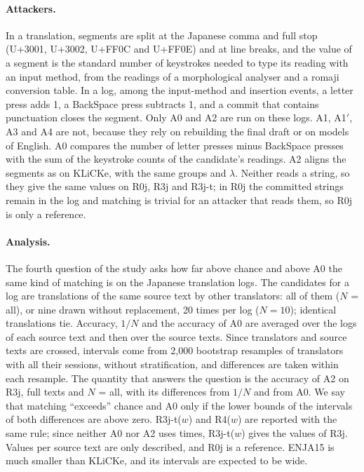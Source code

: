 \paragraph{Attackers.}
In a translation, segments are split at the Japanese comma and full stop (U+3001, U+3002, U+FF0C and U+FF0E) and at
line breaks, and the value of a segment
is the standard number of keystrokes needed to type its reading with an input method, from the readings of a
morphological analyser and a romaji conversion table. In a log, among the input-method and insertion events, a letter
press adds 1, a BackSpace press subtracts 1, and a commit that contains punctuation closes the segment. Only A0 and A2
are run on these logs. A1, A1$'$, A3 and A4 are not, because they rely on rebuilding the final draft or on models of
English. A0 compares the number of letter presses minus BackSpace presses with the sum of the keystroke counts of the
candidate's readings. A2 aligns the segments as on KLiCKe, with the same groups and $\lambda$. Neither reads a string,
so they give the same values on R0j, R3j and R3j-t; in R0j the committed strings remain in the log and matching is
trivial for an attacker that reads them, so R0j is only a reference.

\paragraph{Analysis.}
The fourth question of the study asks how far above chance and above A0 the same kind of matching is on the Japanese
translation logs. The candidates for a log are translations of the same source text by other translators: all of them
($N$ = all), or nine drawn without replacement, 20 times per log ($N = 10$); identical translations tie. Accuracy, $1/N$
and the accuracy of A0 are averaged over the logs of each source text and then over the source texts. Since
translators and source texts are crossed, intervals come from 2,000 bootstrap resamples of translators with all their
sessions, without stratification, and differences are taken within each resample. The quantity that answers the
question is the accuracy of A2 on R3j, full texts and $N$ = all, with its differences from $1/N$ and from A0. We say
that matching ``exceeds'' chance and A0 only if the lower bounds of the intervals of both differences are above zero.
R3j-t($w$) and R4($w$) are reported with the same rule; since neither A0 nor A2 uses times, R3j-t($w$) gives the
values of R3j. Values per source text are only described, and R0j is a reference. ENJA15 is much smaller than KLiCKe, and its intervals are expected to be wide.

